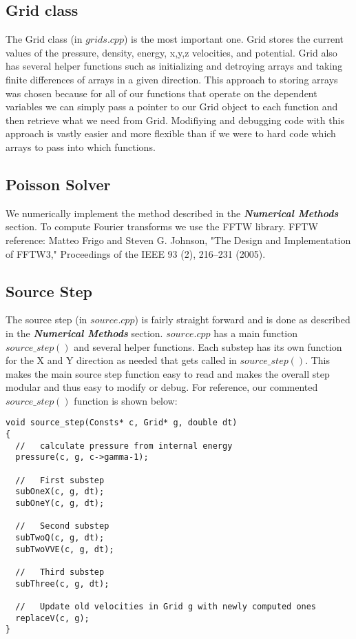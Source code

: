 \documentclass[11pt]{article}
\begin{document}
\subsection{Grid class}
The Grid class (in $grids.cpp$) is the most important one.  Grid stores the current values of the pressure, density, energy, x,y,z velocities, and potential. Grid also has several helper functions such as initializing and detroying arrays and taking finite differences of arrays in a given direction. This approach to storing arrays was chosen because for all of our functions that operate on the dependent variables we can simply pass a pointer to our Grid object to each function and then retrieve what we need from Grid. Modifiying and debugging code with this approach is vastly easier and more flexible than if we were to hard code which arrays to pass into which functions.
\subsection{Poisson Solver}
We numerically implement the method described in the {\bf \it Numerical Methods} section. To compute Fourier transforms we use the FFTW library. FFTW reference: Matteo Frigo and Steven G. Johnson, "The Design and Implementation of FFTW3," Proceedings of the IEEE 93 (2), 216–231 (2005).
\subsection{Source Step}
The source step (in $source.cpp$) is fairly straight forward and is done as described in the {\bf \it Numerical Methods} section. $source.cpp$ has a main function $source\_step()$ and several helper functions. Each substep has its own function for the X and Y direction as needed that gets called in $source\_step()$. This makes the main source step function easy to read and makes the overall step modular and thus easy to modify or debug. For reference, our commented $source\_step()$ function is shown below:

\begin{verbatim}
void source_step(Consts* c, Grid* g, double dt)
{
  //   calculate pressure from internal energy
  pressure(c, g, c->gamma-1);

  //   First substep
  subOneX(c, g, dt);
  subOneY(c, g, dt);

  //   Second substep
  subTwoQ(c, g, dt);
  subTwoVVE(c, g, dt);

  //   Third substep
  subThree(c, g, dt);

  //   Update old velocities in Grid g with newly computed ones
  replaceV(c, g);
}

\end{verbatim}
\end{document}
